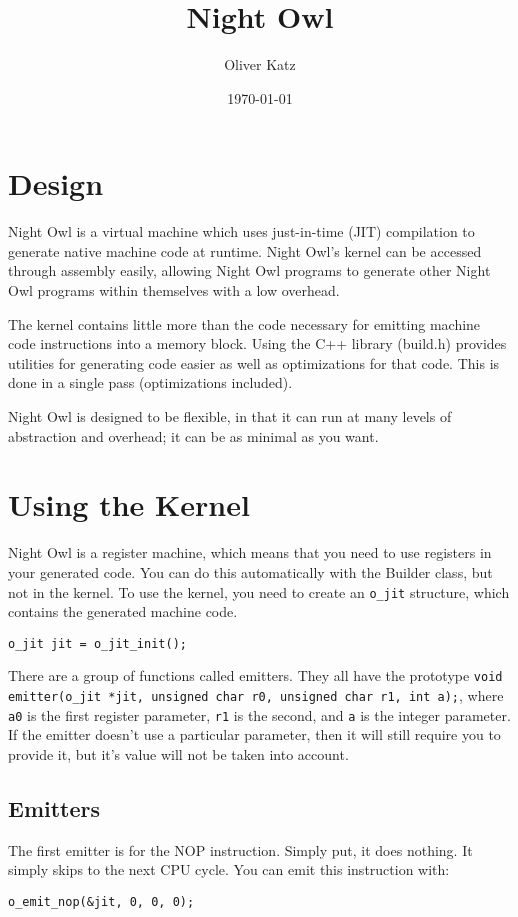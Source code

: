 \documentclass[10pt,a4paper]{article}
\author{Oliver Katz}
\title{Night Owl}
\date{\today}
\begin{document}
\maketitle
\section{Design}
Night Owl is a virtual machine which uses just-in-time (JIT) compilation to generate native machine code at runtime. Night Owl's kernel can be accessed through assembly easily, allowing Night Owl programs to generate other Night Owl programs within themselves with a low overhead.

The kernel contains little more than the code necessary for emitting machine code instructions into a memory block. Using the C++ library (build.h) provides utilities for generating code easier as well as optimizations for that code. This is done in a single pass (optimizations included). 

Night Owl is designed to be flexible, in that it can run at many levels of abstraction and overhead; it can be as minimal as you want. 

\section{Using the Kernel}
Night Owl is a register machine, which means that you need to use registers in your generated code. You can do this automatically with the Builder class, but not in the kernel. To use the kernel, you need to create an \verb|o_jit| structure, which contains the generated machine code. 
\begin{verbatim}
o_jit jit = o_jit_init();
\end{verbatim}

There are a group of functions called emitters. They all have the prototype \verb|void emitter(o_jit *jit, unsigned char r0, unsigned char r1, int a);|, where \verb|a0| is the first register parameter, \verb|r1| is the second, and \verb|a| is the integer parameter. If the emitter doesn't use a particular parameter, then it will still require you to provide it, but it's value will not be taken into account. 

\subsection{Emitters}
The first emitter is for the NOP instruction. Simply put, it does nothing. It simply skips to the next CPU cycle. You can emit this instruction with:
\begin{verbatim}
o_emit_nop(&jit, 0, 0, 0);
\end{verbatim}
\end{document}
